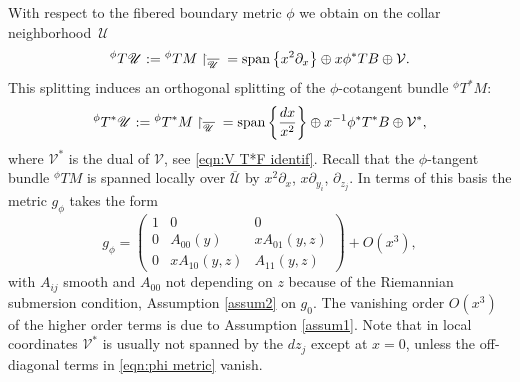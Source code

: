 \documentclass[11pt]{article}
\numberwithin{equation}{section}
\theoremstyle{plain}
\theoremstyle{definition}
\newcommand{\Umath}{{\mathscr{U}}}
\newcommand\calV{{\mathcal V}}
\DeclareMathOperator{\Span}{span}
\newcommand{\phiT}{{}^\phi T}
\begin{document}
With respect to the fibered boundary metric $\phi$ we obtain on the collar neighborhood~$\Umath$
\begin{equation}\label{splitting1}
{}^\phi T\U := \phiT M\restriction_{\overline{\mathscr{U}}}{} =
\Span \left\{x^2\partial_x\right\} \oplus x \phi^{*}T B \oplus \calV.
\end{equation}
This splitting induces an orthogonal splitting of the
$\phi$-cotangent bundle ${}^\phi T^*M$:
\begin{equation}\label{splitting2}
{}^\phi T^*\U :=
{}^\phi T^*M \restriction_{\overline{\mathscr{U}}}{} = \Span \left\{ \frac{dx}{x^2}\right\} \oplus x^{-1} \phi^*T^*B \oplus \calV^*,
\end{equation}
where $\calV^*$ is the dual of $\calV$, see \eqref{eqn:V T*F identif}.
Recall that the $\phi$-tangent bundle ${}^\phi TM$ is spanned locally over $\overline{\mathscr{U}}$
by $x^2\partial_x$, $x\partial_{y_i}$, $\partial_{z_j}$. In terms of this basis the metric $g_\phi$ takes the form
\begin{equation}
\label{eqn:phi metric}
g_\phi =
\begin{pmatrix}
1 & 0 & 0 \\
0 & A_{00}(y) & x A_{01}(y,z) \\
0 & x A_{10}(y,z) & A_{11}(y,z)
\end{pmatrix}
+ O(x^3),
\end{equation}
with $A_{ij}$ smooth and $A_{00}$ not depending on $z$ because of the Riemannian submersion condition, Assumption \ref{assum2} on $g_0$.
The vanishing order $O(x^3)$ of the higher order terms is due to Assumption \ref{assum1}.
Note that in local coordinates $\calV^*$ is usually not spanned by the $dz_j$ except at $x=0$, unless the off-diagonal terms in \eqref{eqn:phi metric} vanish.
\end{document}
